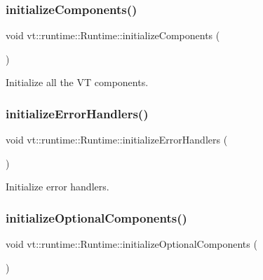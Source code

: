 \subsubsection{\texorpdfstring{initialize\+Components()}{initializeComponents()}}
{\footnotesize\ttfamily void vt\+::runtime\+::\+Runtime\+::initialize\+Components (\begin{DoxyParamCaption}{ }\end{DoxyParamCaption})\hspace{0.3cm}{\ttfamily [protected]}}



Initialize all the VT components. 

\mbox{\label{structvt_1_1runtime_1_1_runtime_adf6407cff70ac8c332d75911a81b508d}} 
\subsubsection{\texorpdfstring{initialize\+Error\+Handlers()}{initializeErrorHandlers()}}
{\footnotesize\ttfamily void vt\+::runtime\+::\+Runtime\+::initialize\+Error\+Handlers (\begin{DoxyParamCaption}{ }\end{DoxyParamCaption})\hspace{0.3cm}{\ttfamily [protected]}}



Initialize error handlers. 

\mbox{\label{structvt_1_1runtime_1_1_runtime_a61abc4a1b440263bd129ee0950a05e69}} 
\subsubsection{\texorpdfstring{initialize\+Optional\+Components()}{initializeOptionalComponents()}}
{\footnotesize\ttfamily void vt\+::runtime\+::\+Runtime\+::initialize\+Optional\+Components (\begin{DoxyParamCaption}{ }\end{DoxyParamCaption})\hspace{0.3cm}{\ttfamily [protected]}}



